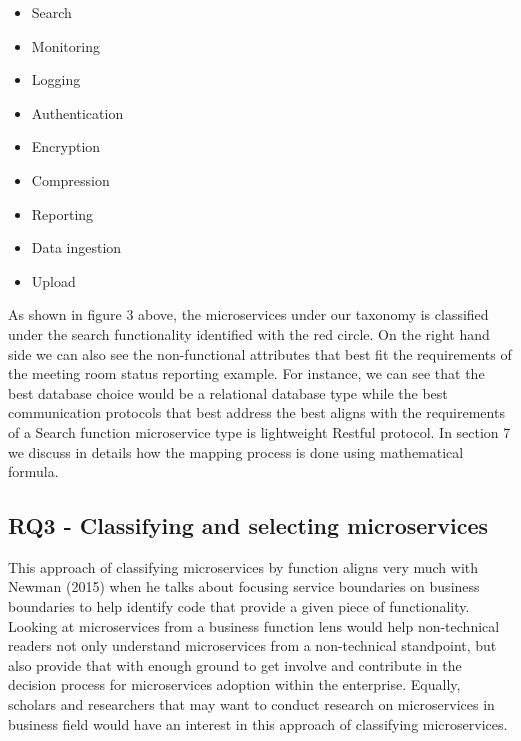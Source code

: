 \documentclass{article}
\begin{document}
\begin{itemize}


\item Search
\item Monitoring
\item Logging
\item Authentication
\item Encryption
\item Compression
\item Reporting
\item Data ingestion
\item Upload
\end{itemize}

As shown in figure 3 above, the microservices under our taxonomy is classified under the search functionality identified with the red circle. On the right hand side we can also see the non-functional attributes that best fit the requirements of the meeting room status reporting example. For instance, we can see that the best database choice would be a relational database type while the best communication protocols that best address the best aligns with the requirements of a Search function microservice type is lightweight Restful protocol. In section 7 we discuss in details how the mapping process is done using mathematical formula.

\subsection{RQ3 - Classifying and selecting microservices}

This approach of classifying microservices by function aligns very much with Newman (2015) when he talks about focusing service boundaries on business boundaries to help identify code that provide a given piece of functionality. Looking at microservices from a business function lens would help non-technical readers not only understand microservices from a non-technical standpoint, but also provide that with enough ground to get involve and contribute in the decision process for microservices adoption within the enterprise. Equally, scholars and researchers that may want to conduct research on microservices in business field would have an interest in this approach of classifying microservices.
\end{document}
